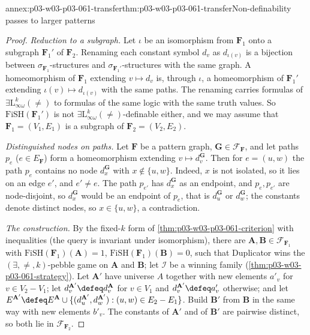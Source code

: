 \begin{annexitem}{annex:p03-w03-p03-061-transfer}{thm:p03-w03-p03-061-transfer}{Non-definability passes to larger patterns}
\begin{proof}
\emph{Reduction to a subgraph.} Let \(\iota\) be an isomorphism from
\(\mathbf F_1\) onto a subgraph \(\mathbf F_1'\) of \(\mathbf F_2\).
Renaming each constant symbol \(d_v\) as \(d_{\iota(v)}\) is a bijection
between \(\sigma_{\mathbf F_1}\)-structures and
\(\sigma_{\mathbf F_1'}\)-structures with the same graph. A homeomorphism of
\(\mathbf F_1\) extending \(v\mapsto d_v\) is, through \(\iota\), a
homeomorphism of \(\mathbf F_1'\) extending \(\iota(v)\mapsto
d_{\iota(v)}\) with the same paths. The renaming carries formulas of
\(\exists\mathrm L^k_{\infty\omega}(\neq)\) to formulas of the same logic
with the same truth values. So \(\mathrm{FiSH}(\mathbf F_1')\) is not
\(\exists\mathrm L^k_{\infty\omega}(\neq)\)-definable either, and we may
assume that \(\mathbf F_1=(V_1,E_1)\) is a subgraph of
\(\mathbf F_2=(V_2,E_2)\).

\emph{Distinguished nodes on paths.} Let \(\mathbf F\) be a pattern graph,
\(\mathbf G\in\mathcal F_{\mathbf F}\), and let paths \(p_e\)
(\(e\in E_{\mathbf F}\)) form a homeomorphism extending
\(v\mapsto d_v^{\mathbf G}\). Then for \(e=(u,w)\) the path \(p_e\) contains
no node \(d_x^{\mathbf G}\) with \(x\notin\{u,w\}\). Indeed, \(x\) is not
isolated, so it lies on an edge \(e'\), and \(e'\neq e\). The path
\(p_{e'}\) has \(d_x^{\mathbf G}\) as an endpoint, and \(p_e,p_{e'}\) are
node-disjoint, so \(d_x^{\mathbf G}\) would be an endpoint of \(p_e\), that
is \(d_u^{\mathbf G}\) or \(d_w^{\mathbf G}\); the constants denote distinct
nodes, so \(x\in\{u,w\}\), a contradiction.

\emph{The construction.} By the fixed-\(k\) form of
\cref{thm:p03-w03-p03-061-criterion} with inequalities (the query is
invariant under isomorphism), there are \(\mathbf A,\mathbf B\in\mathcal
F_{\mathbf F_1}\) with \(\mathrm{FiSH}(\mathbf F_1)(\mathbf A)=1\),
\(\mathrm{FiSH}(\mathbf F_1)(\mathbf B)=0\), such that Duplicator wins the
\((\exists,\neq,k)\)-pebble game on \(\mathbf A\) and \(\mathbf B\); let
\(\mathcal I\) be a winning family (\cref{thm:p03-w03-p03-061-strategy}).
Let \(\mathbf A'\) have universe \(A\) together with new elements \(a'_v\)
for \(v\in V_2-V_1\); let \(d_v^{\mathbf A'}\defeq d_v^{\mathbf A}\) for
\(v\in V_1\) and \(d_v^{\mathbf A'}\defeq a'_v\) otherwise; and let
\(E^{\mathbf A'}\defeq E^{\mathbf A}\cup\{(d_u^{\mathbf A'},d_w^{\mathbf
A'}):(u,w)\in E_2-E_1\}\). Build \(\mathbf B'\) from \(\mathbf B\) in the same
way with new elements \(b'_v\). The constants of \(\mathbf A'\) and of
\(\mathbf B'\) are pairwise distinct, so both lie in
\(\mathcal F_{\mathbf F_2}\).


\end{proof}
\end{annexitem}
